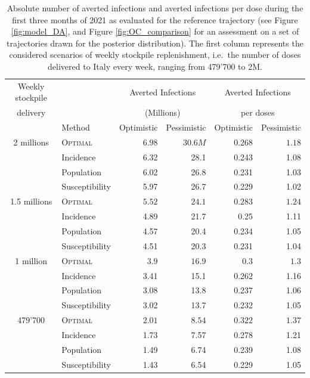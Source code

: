 \begin{table}[h!]
\centering
\begin{tabular}{clrrrr}
\toprule
Weekly stockpile& {} & \multicolumn{2}{c}{Averted Infections} & \multicolumn{2}{c}{Averted Infections} \\
delivery&  {}  &\multicolumn{2}{c}{(Millions)} & \multicolumn{2}{c}{ per doses} \\
& Method &  Optimistic & Pessimistic &     Optimistic & Pessimistic \\
\midrule
2 millions & \textsc{Optimal} &   $6.98$ &  $30.6M$ & $0.268$ & $1.18$ \\
        & Incidence &   6.32 &    28.1 &          0.243 &        1.08 \\
        & Population &   6.02 &    26.8 &          0.231 &        1.03 \\
        & Susceptibility &   5.97 &    26.7 &          0.229 &        1.02 \\
1.5 millions & \textsc{Optimal} &   $5.52$ &   $24.1$ &  $ 0.283$ & $1.24$ \\
        & Incidence &   4.89 &    21.7 &           0.25 &        1.11 \\
        & Population &   4.57 &    20.4 &          0.234 &        1.05 \\
        & Susceptibility &   4.51 &    20.3 &          0.231 &        1.04 \\
1 million & \textsc{Optimal} &    $3.9$ &    $16.9$ &  $0.3$ & $1.3$ \\
        & Incidence &   3.41 &    15.1 &          0.262 &        1.16 \\
        & Population &   3.08 &    13.8 &          0.237 &        1.06 \\
        & Susceptibility &   3.02 &    13.7 &          0.232 &        1.05 \\
479'700 & \textsc{Optimal} &  $2.01$ &  $8.54$ & $0.322$ & $1.37$ \\
        & Incidence &   1.73 &    7.57 &          0.278 &        1.21 \\
        & Population &   1.49 &    6.74 &          0.239 &        1.08 \\
        & Susceptibility &   1.43 &    6.54 &          0.229 &        1.05 \\
\bottomrule
\end{tabular}

\caption[Averted infections per dose for different allocation strategies]{Absolute number of averted infections and averted infections per dose during the first three months of 2021 as evaluated for the reference trajectory (see Figure \ref{fig:model_DA}, and Figure \ref{fig:OC_comparison} for an assessment on a set of trajectories drawn for the posterior distribution). The first column represents the considered scenarios of weekly stockpile replenishment, i.e.~the number of doses delivered to Italy every week, ranging from 479'700 to 2M.}
\label{table:averted_abs}
\end{table}
